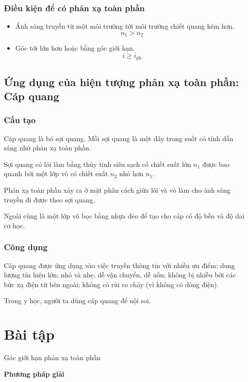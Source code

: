 \subsubsection{Điều kiện để có phản xạ toàn phần}

\begin{itemize}
	\item Ánh sáng truyền từ một môi trường tới  môi trường chiết quang kém hơn.
	\begin{equation}
	n_1>n_2
	\end{equation}
	
	\item Góc tới lớn hơn hoặc bằng góc giới hạn.
		\begin{equation}
	i\geq i_{\text{gh}}
	\end{equation}
	
\end{itemize}

\subsection{Ứng dụng của hiện tượng phản xạ toàn phần: Cáp quang}
\subsubsection{Cấu tạo}
Cáp quang là bó sợi quang. Mỗi sợi quang là một dây trong suốt có tính dẫn sáng nhờ phản xạ toàn phần.

Sợi quang có lỏi làm bằng thủy tinh siêu sạch có chiết suất lớn $n_1$  được bao quanh bởi một lớp vỏ có chiết suất $n_2$ nhỏ hơn $n_1$. 

Phản xạ toàn phần xảy ra ở mặt phân cách giữa lõi và vỏ làm cho ánh sáng truyền đi được theo sợi quang. 

Ngoài cùng là một lớp võ bọc bằng nhựa dẻo để tạo cho cáp có độ bền và độ dai cơ học.

\subsubsection{Công dụng}
Cáp quang được ứng dụng vào việc truyền thông tin với nhiều ưu điểm: dung lượng tín hiệu lớn; nhỏ và nhẹ, dễ vận chuyển, dễ uốn; không bị nhiễu bởi các bức xạ điện từ bên ngoài; không có rủi ro cháy (vì không có dòng điện).

Trong y học, người ta dùng cáp quang để nội soi.


\section{Bài tập }
\begin{dang}{Góc giới hạn phản xạ toàn phần}
\end{dang}
\textbf{Phương pháp giải}

